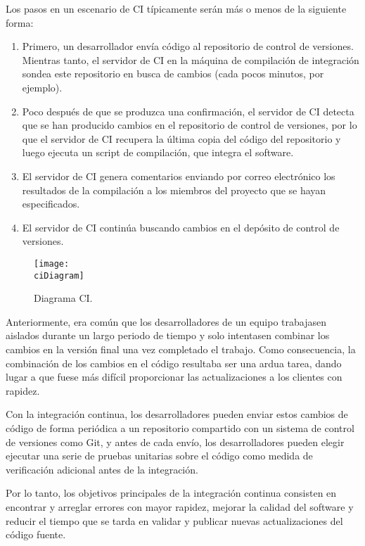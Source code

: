 Los pasos en un escenario de CI típicamente serán más o menos de la siguiente forma:
\begin{enumerate}
    \item Primero, un desarrollador envía código al repositorio de control de versiones. Mientras tanto, el servidor de CI en la máquina de compilación de integración sondea este repositorio en busca de cambios (cada pocos minutos, por ejemplo).
    \item Poco después de que se produzca una confirmación, el servidor de CI detecta que se han producido cambios en el repositorio de control de versiones, por lo que el servidor de CI recupera la última copia del código del repositorio y luego ejecuta un script de compilación, que integra el software.
    \item El servidor de CI genera comentarios enviando por correo electrónico los resultados de la compilación a los miembros del proyecto que se hayan especificados.
    \item El servidor de CI continúa buscando cambios en el depósito de control de versiones.
\end{enumerate}

\begin{figure}[h]
    \centering
    \texttt{[image: \\ciDiagram]}
    \caption{Diagrama CI.}
\end{figure}

Anteriormente, era común que los desarrolladores de un equipo trabajasen aislados durante un largo periodo de tiempo y solo intentasen combinar los cambios en la versión final una vez completado el trabajo. Como consecuencia, la combinación de los cambios en el código resultaba ser una ardua tarea, dando lugar a que fuese más difícil proporcionar las actualizaciones a los clientes con rapidez.

Con la integración continua, los desarrolladores pueden enviar estos cambios de código de forma periódica a un repositorio compartido con un sistema de control de versiones como Git, y antes de cada envío, los desarrolladores pueden elegir ejecutar una serie de pruebas unitarias sobre el código como medida de verificación adicional antes de la integración.

Por lo tanto, los objetivos principales de la integración continua consisten en encontrar y arreglar errores con mayor rapidez, mejorar la calidad del software y reducir el tiempo que se tarda en validar y publicar nuevas actualizaciones del código fuente.

